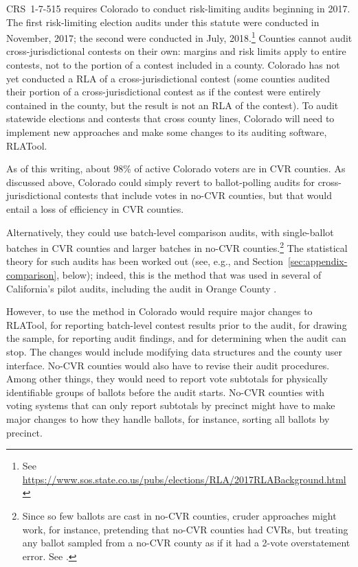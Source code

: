 \documentclass[runningheads]{llncs}
\begin{document}
CRS~1-7-515 requires Colorado to conduct risk-limiting audits beginning in 2017.
The first risk-limiting election audits under this statute were conducted in November, 2017; the second were conducted in July, 2018.\footnote{%
 See \url{https://www.sos.state.co.us/pubs/elections/RLA/2017RLABackground.html}
}
Counties cannot audit cross-jurisdictional contests on their own:
margins and risk limits apply to entire contests, not to the portion of a contest included in a county.
Colorado has not yet conducted a RLA of a cross-jurisdictional contest (some counties audited their portion of a cross-jurisdictional contest as if the contest were entirely contained in the county, but the result is not an RLA of the contest).
To audit statewide elections and contests that cross county lines, Colorado will need to implement new approaches and make some changes to its auditing software, RLATool.

As of this writing, about 98\% of active Colorado voters are in CVR counties.
As discussed above, Colorado could simply revert to ballot-polling audits for cross-jurisdictional contests that include votes in no-CVR counties, but that would entail a loss of efficiency in CVR counties.

Alternatively, they could use batch-level comparison audits, with single-ballot batches in CVR counties and larger batches in no-CVR counties.\footnote{%
Since so few ballots are cast in no-CVR counties, cruder approaches might work, for instance, pretending that no-CVR counties had CVRs, but treating any ballot sampled from a no-CVR county as if it had a 2-vote overstatement error. See \cite{banuelosStark12}.
}
The statistical theory for such audits has been worked out (see, e.g., \cite{stark08a,stark09c,stark09b,stark10d} and Section~\ref{sec:appendix-comparison}, below); indeed, this is the method that was used in several of California's pilot audits,
including the audit in Orange County \cite{CA_SOS_EAC}.

However, to use the method in Colorado would require major changes to RLATool, for reporting batch-level contest results prior to the audit, for drawing the sample, for reporting audit findings, and for determining when the audit can stop. 
The changes would include modifying data structures and the county user interface.
No-CVR counties would also have to revise their audit procedures.
Among other things, they would need to report vote subtotals
for physically identifiable groups of ballots before the audit starts.
No-CVR counties with voting systems that can only report subtotals by precinct
might have to make major changes to how they handle ballots, for instance, sorting all ballots by precinct.
\end{document}
